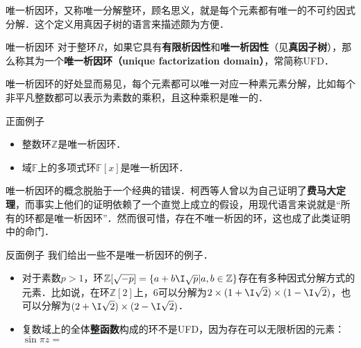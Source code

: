 


唯一析因环，又称唯一分解整环，顾名思义，就是每个元素都有唯一的不可约因式分解．这个定义用真因子树的语言来描述颇为方便．

\begin{definition}{唯一析因环}
对于整环$R$，如果它具有\textbf{有限析因性}和\textbf{唯一析因性}（见\textbf{真因子树}），那么称其为一个\textbf{唯一析因环（unique factorization domain）}，常简称UFD．
\end{definition}

唯一析因环的好处显而易见，每个元素都可以唯一对应一种素元素分解，比如每个非平凡整数都可以表示为素数的乘积，且这种乘积是唯一的．

\begin{example}{正面例子}
\begin{itemize}
\item 整数环$\mathbb{Z}$是唯一析因环．
\item 域$\mathbb{F}$上的多项式环$\mathbb{F}[x]$是唯一析因环．
\end{itemize}
\end{example}

唯一析因环的概念脱胎于一个经典的错误．柯西等人曾以为自己证明了\textbf{费马大定理}，而事实上他们的证明依赖了一个直觉上成立的假设，用现代语言来说就是“所有的环都是唯一析因环”．然而很可惜，存在不唯一析因的环，这也成了此类证明中的命门．

\begin{example}{反面例子}
我们给出一些不是唯一析因环的例子．
\begin{itemize}
\item 对于素数$p>1$，环$\mathbb{Z}[\sqrt{-p}]=\{a+b\I\sqrt{p}|a, b\in\mathbb{Z}\}$存在有多种因式分解方式的元素．比如说，在环$\mathbb{Z}[2]$上，$6$可以分解为$2\times (1+\I\sqrt{2})\times(1-\I\sqrt{2})$，也可以分解为$(2+\I\sqrt{2})\times(2-\I\sqrt{2})$．
\item 复数域上的全体\textbf{整函数}构成的环不是UFD，因为存在可以无限析因的元素：$\sin{\pi z=}$
\end{itemize}
\end{example}


